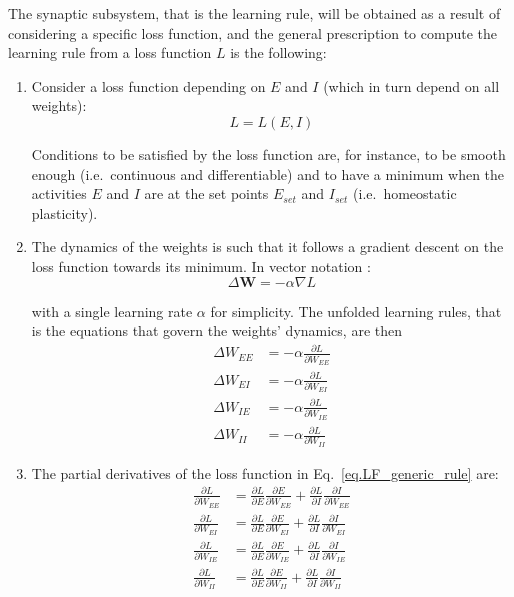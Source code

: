 \documentclass[twocolumn]{article}
\newcommand{\EE}{\mathit{EE}}
\newcommand{\EI}{\mathit{EI}}
\newcommand{\IE}{\mathit{IE}}
\newcommand{\II}{\mathit{II}}
\newcommand{\set}{\mathit{set}}
\begin{document}
The synaptic subsystem, that is the learning rule, will be obtained as a result of considering a specific loss function, and the general prescription to compute the learning rule from a loss function $L$ is the following:
\begin{enumerate}
\item Consider a loss function depending on $E$ and $I$ (which in turn depend on all weights):
\begin{displaymath}
L = L(E,I)
\end{displaymath}

\noindent Conditions to be satisfied by the loss function are, for instance, to be smooth enough (i.e.\ continuous and differentiable) and to have a minimum when the activities $E$ and $I$ are at the set points $E_{\set}$ and $I_{\set}$ (i.e.\ homeostatic plasticity).

\item The dynamics of the weights is such that it follows a gradient descent on the loss function towards its minimum. In vector notation :
\begin{equation}
\Delta \mathbf{W} = -\alpha \nabla L
\label{eq.LF_gradient}
\end{equation}

\noindent with a single learning rate $\alpha$ for simplicity. The unfolded learning rules, that is the equations that govern the weights' dynamics, are then
\begin{equation}
\begin{aligned}
\Delta W_{\EE} & = - \alpha \frac{\partial L}{\partial W_{\EE}} \\
\Delta W_{\EI} & = - \alpha \frac{\partial L}{\partial W_{\EI}} \\
\Delta W_{\IE} & = - \alpha \frac{\partial L}{\partial W_{\IE}} \\
\Delta W_{\II} & = - \alpha \frac{\partial L}{\partial W_{\II}} \end{aligned}
\label{eq.LF_generic_rule}
\end{equation}


\item The partial derivatives of the loss function in Eq.\ \ref{eq.LF_generic_rule} are:
\begin{equation}
\begin{aligned}
\frac{\partial L}{\partial W_{\EE}} & = \frac{\partial L}{\partial E} \frac{\partial E}{\partial W_{\EE}} + \frac{\partial L}{\partial I} \frac{\partial I}{\partial W_{\EE}} \\
\frac{\partial L}{\partial W_{\EI}} & = \frac{\partial L}{\partial E} \frac{\partial E}{\partial W_{\EI}} + \frac{\partial L}{\partial I} \frac{\partial I}{\partial W_{\EI}} \\
\frac{\partial L}{\partial W_{\IE}} & = \frac{\partial L}{\partial E} \frac{\partial E}{\partial W_{\IE}} + \frac{\partial L}{\partial I} \frac{\partial I}{\partial W_{\IE}} \\
\frac{\partial L}{\partial W_{\II}} & = \frac{\partial L}{\partial E} \frac{\partial E}{\partial W_{\II}} + \frac{\partial L}{\partial I} \frac{\partial I}{\partial W_{\II}} \end{aligned}
\label{eq.LF_chain_rule}
\end{equation}


\end{enumerate}
\end{document}
